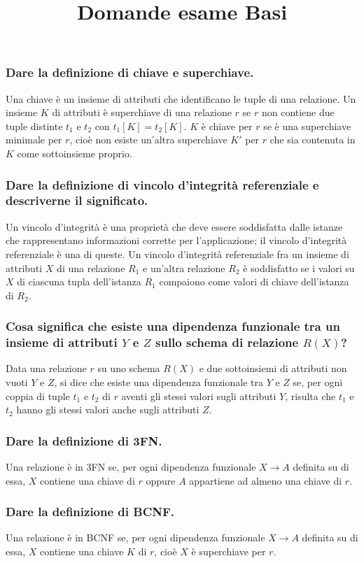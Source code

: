 \documentclass[11pt]{article}
\title{Domande esame Basi}
\begin{document}
\subsubsection*{Dare la definizione di chiave e superchiave.}
Una chiave è un insieme di attributi che identificano le tuple di una relazione. Un insieme $K$ di attributi è superchiave 
di una relazione $r$ se $r$ non contiene due tuple distinte $t_1$ e $t_2$ con $t_1[K]=t_2[K]$. $K$ è chiave per $r$ se è
una superchiave minimale per $r$, cioè non esiste un'altra superchiave $K'$ per $r$ che sia contenuta in $K$ come sottoinsieme 
proprio.
\subsubsection*{Dare la definizione di vincolo d'integrità referenziale e descriverne il significato.}
Un vincolo d'integrità è una proprietà che deve essere soddisfatta dalle istanze che rappresentano informazioni corrette 
per l'applicazione; il vincolo d'integrità referenziale è una di queste. Un vincolo d'integrità referenziale fra un insieme 
di attributi $X$ di una relazione $R_1$ e un'altra relazione $R_2$ è soddisfatto se i valori su $X$ di ciascuna tupla 
dell'istanza $R_1$ compaiono come valori di chiave dell'istanza di $R_2$.
\subsubsection*{Cosa significa che esiste una dipendenza funzionale tra un insieme di attributi $Y$ e $Z$ sullo schema di
relazione $R(X)$?}
Data una relazione $r$ su uno schema $R(X)$ e due sottoinsiemi di attributi non vuoti $Y$ e $Z$, si dice che esiste una
dipendenza funzionale tra $Y$ e $Z$ se, per ogni coppia di tuple $t_1$ e $t_2$ di $r$ aventi gli stessi valori sugli 
attributi $Y$, risulta che $t_1$ e $t_2$ hanno gli stessi valori anche sugli attributi $Z$. 
\subsubsection*{Dare la definizione di 3FN.}
Una relazione è in 3FN se, per ogni dipendenza funzionale $X\rightarrow A$ definita su di essa, $X$ contiene una chiave 
di $r$ oppure $A$ appartiene ad almeno una chiave di $r$.
\subsubsection*{Dare la definizione di BCNF.}
Una relazione è in BCNF se, per ogni dipendenza funzionale $X\rightarrow A$ definita su di essa, $X$ contiene una chiave 
$K$ di $r$, cioè $X$ è superchiave per $r$.
\end{document}
